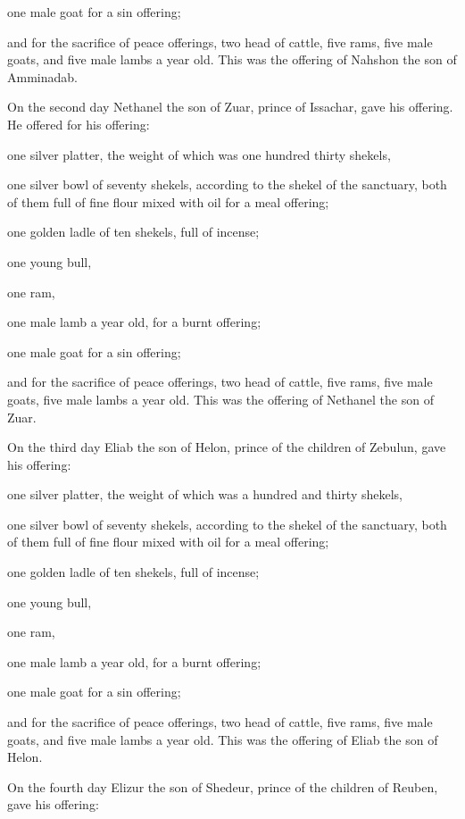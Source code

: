 \myverse{}one male goat for a sin offering;


\myverse{}and for the sacrifice of peace offerings, two head of cattle,
five rams, five male goats, and five male lambs a year old. This was the offering of Nahshon the son of
Amminadab.


\myverse{}On the second day Nethanel the son of Zuar, prince of Issachar,
gave his offering.
\myverse{}He offered for his offering:

one silver platter, the weight of which was one hundred thirty shekels,

one silver bowl of seventy shekels, according to the shekel of the sanctuary, both of them
full of fine flour mixed with oil for a meal offering;


\myverse{}one golden ladle of ten shekels, full of incense;


\myverse{}one young bull,

one ram,

one male lamb a year old, for a burnt offering;


\myverse{}one male goat for a sin offering;


\myverse{}and for the sacrifice of peace offerings, two head of cattle,
five rams, five male goats, five male lambs a year old. This was the offering of Nethanel the son of Zuar.


\myverse{}On the third day Eliab the son of Helon, prince of the children
of Zebulun,
\myverse{}gave his offering:

one silver platter, the weight of which was a hundred and thirty shekels,

one silver bowl of seventy shekels, according to the shekel of the sanctuary, both of them
full of fine flour mixed with oil for a meal offering;


\myverse{}one golden ladle of ten shekels, full of incense;


\myverse{}one young bull,

one ram,

one male lamb a year old, for a burnt offering;


\myverse{}one male goat for a sin offering;


\myverse{}and for the sacrifice of peace offerings, two head of cattle,
five rams, five male goats, and five male lambs a year old. This was the offering of Eliab the son of
Helon.


\myverse{}On the fourth day Elizur the son of Shedeur, prince of the children
of Reuben,
\myverse{}gave his offering:

